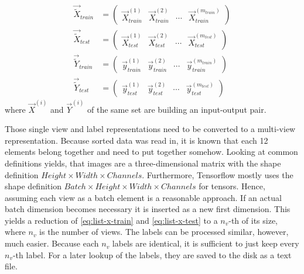 \begin{subequations}
	\begin{align}
		\label{eq:list-x-train}
		\vec{\tilde{X}}_{train} &=
		\begin{pmatrix}
			\vec{X}_{train}^{(1)} & \vec{X}_{train}^{(2)} & \cdots & \vec{X}_{train}^{(m_{train})}
		\end{pmatrix}
		\\
		\label{eq:list-x-test}
		\vec{\tilde{X}}_{test} &=
		\begin{pmatrix}
			\vec{X}_{test}^{(1)} & \vec{X}_{test}^{(2)} & \cdots & \vec{X}_{test}^{(m_{test})}
		\end{pmatrix}
		\\
		\label{eq:list-y-train}
		\vec{\tilde{Y}}_{train} &=
		\begin{pmatrix}
			\vec{y}_{train}^{(1)} & \vec{y}_{train}^{(2)} & \cdots & \vec{y}_{train}^{(m_{train})}
		\end{pmatrix}
		\\
		\label{eq:list-y-test}
		\vec{\tilde{Y}}_{test} &=
		\begin{pmatrix}
			\vec{y}_{test}^{(1)} & \vec{y}_{test}^{(2)} & \cdots & \vec{y}_{test}^{(m_{test})}
		\end{pmatrix}
	\end{align}
\end{subequations}
where $\vec{X}^{(i)}$ and $\vec{Y}^{(i)}$ of the same set are building an input-output pair.

Those single view and label representations need to be converted to a multi-view representation.
Because sorted data was read in, it is known that each 12 elements belong together and need to put together somehow.
Looking at common definitions yields, that images are a three-dimensional matrix with the shape definition $Height \times Width \times Channels$.
Furthermore, Tensorflow mostly uses the shape definition $Batch \times Height \times Width \times Channels$ for tensors.
Hence, assuming each view as a batch element is a reasonable approach.
If an actual batch dimension becomes necessary it is inserted as a new first dimension.
This yields a reduction of \eqref{eq:list-x-train} and \eqref{eq:list-x-test} to a $n_v$-th of its size, where $n_v$ is the number of views.
The labels can be processed similar, however, much easier.
Because each $n_v$ labels are identical, it is sufficient to just keep every $n_v$-th label.
For a later lookup of the labels, they are saved to the disk as a text file.